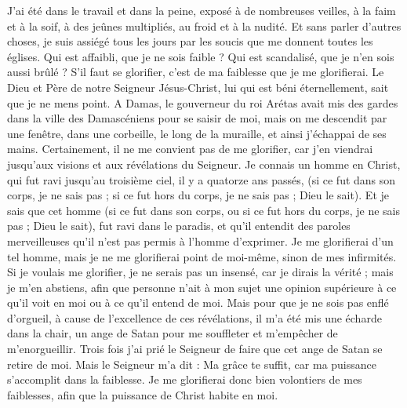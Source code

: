 \begin{multicols}{2}
J’ai été dans le travail et dans la peine, exposé à de nombreuses veilles, à la faim et à la soif, à des jeûnes multipliés, au froid et à la nudité.
Et sans parler d’autres choses, je suis assiégé tous les jours par les soucis que me donnent toutes les églises.
Qui est affaibli, que je ne sois faible ? Qui est scandalisé, que je n'en sois aussi brûlé ?
S'il faut se glorifier, c’est de ma faiblesse que je me glorifierai.
Le Dieu et Père de notre Seigneur Jésus-Christ, lui qui est béni éternellement, sait que je ne mens point.
A Damas, le gouverneur du roi Arétas avait mis des gardes dans la ville des Damascéniens pour se saisir de moi,
mais on me descendit par une fenêtre, dans une corbeille, le long de la muraille, et ainsi j'échappai de ses mains.
\VerseOne{}Certainement, il ne me convient pas de me glorifier, car j’en viendrai jusqu’aux visions et aux révélations du Seigneur.
Je connais un homme en Christ, qui fut ravi jusqu’au troisième ciel, il y a quatorze ans passés, (si ce fut dans son corps, je ne sais pas ; si ce fut hors du corps, je ne sais pas ; Dieu le sait).
Et je sais que cet homme (si ce fut dans son corps, ou si ce fut hors du corps, je ne sais pas ; Dieu le sait),
fut ravi dans le paradis, et qu’il entendit des paroles merveilleuses qu'il n'est pas permis à l'homme d’exprimer.
Je me glorifierai d'un tel homme, mais je ne me glorifierai point de moi-même, sinon de mes infirmités.
Si je voulais me glorifier, je ne serais pas un insensé, car je dirais la vérité ; mais je m'en abstiens, afin que personne n’ait à mon sujet une opinion supérieure à ce qu’il voit en moi ou à ce qu’il entend de moi.
Mais pour que je ne sois pas enflé d’orgueil, à cause de l'excellence de ces révélations, il m'a été mis une écharde dans la chair, un ange de Satan pour me souffleter et m’empêcher de m’enorgueillir.
Trois fois j'ai prié le Seigneur de faire que cet ange de Satan se retire de moi.
Mais le Seigneur m'a dit : Ma grâce te suffit, car ma puissance s’accomplit dans la faiblesse. Je me glorifierai donc bien volontiers de mes faiblesses, afin que la puissance de Christ habite en moi.

\end{multicols}
